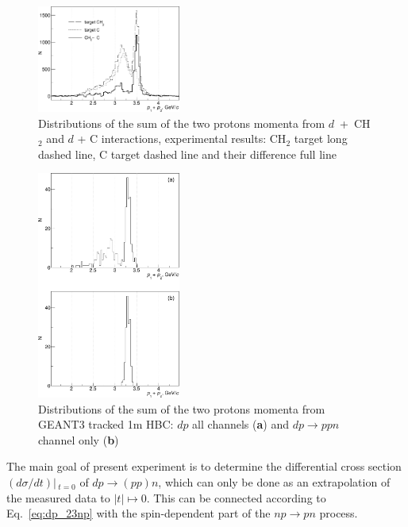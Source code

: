 \documentclass[twocolumn,epjc3]{svjour3}
\newcommand{\np}     {\ensuremath{np \rightarrow pn}\xspace}
\newcommand{\dpfrag} {\ensuremath{dp \rightarrow ppn}\xspace}
\newcommand{\dpchex} {\ensuremath{dp \rightarrow (pp)n}\xspace}
\begin{document}
\begin{figure}[t]
  \centering
  \includegraphics[width=0.42\textwidth]{p1_plus_p2_1.pdf}
  \caption{Distributions of the sum of the two protons momenta from
    $d$~+~CH$_{2}$ and $d$ + C interactions, experimental results: CH$_2$ target
    long dashed line, C target dashed line and their difference full line}
  \label{fig:p1p2exp}
\end{figure}
\begin{figure}[t]
  \centering
  \includegraphics[width=0.42\textwidth]{p1_plus_p2_2.pdf}
  \caption{Distributions of the sum of the two protons momenta from GEANT3
    tracked 1m HBC: $dp$ all channels (\textbf{a}) and \dpfrag channel only
    (\textbf{b})}
  \label{fig:p1p2sim}
\end{figure}

The main goal of present experiment is to determine the differential cross
section $(d\sigma/dt)|\,_{t=0}$ of \dpchex, which can only be done as an
extrapolation of the measured data to $|t|\mapsto0$. This can be connected
according to Eq.~\eqref{eq:dp_23np} with the spin-dependent part of the \np
process.
\end{document}
